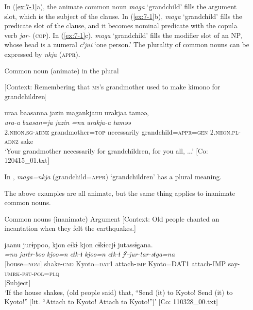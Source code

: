 \z
\z

In (\ref{ex:7-1}a), the animate common noun \textit{maga} ‘grandchild’ fills the argument slot, which is the subject of the clause. In (\ref{ex:7-1}b), \textit{maga} ‘grandchild’ fills the predicate slot of the clause, and it becomes nominal predicate with the copula verb \textit{jar-} (\textsc{cop}). In (\ref{ex:7-1}c), \textit{maga} ‘grandchild’ fills the modifier slot of an NP, whose head is a numeral \textit{cˀjui} ‘one person.’ The plurality of common nouns can be expressed by \textit{nkja} (\textsc{appr}).

\ea \label{ex:7:2}  Common noun (animate) in the plural

  [Context: Remembering that \textsc{ms}’s grandmother used to make kimono for grandchildren]

{\TM}
\glll uraa  baasanna  jazin  magankjanu urakjaa  taməə,\\
\textit{ura-a}  \textit{baasan=ja}  \textit{jazin}  \textit{=nu}   \textit{urakja-a}  \textit{taməə}\\
    2.\textsc{nhon}.\textsc{sg}-\textsc{adnz}  grandmother=\textsc{top}  necessarily  grandchild=\textsc{appr}=\textsc{gen}  2.\textsc{nhon}.\textsc{pl}-\textsc{adnz}  sake\\
\glt    ‘Your grandmother necessarily for grandchildren, for you all, ...’ [Co: 120415\_01.txt]

\z

In , \textit{maga=nkja} (grandchild=\textsc{appr}) ‘grandchildren’ has a plural meaning.

  The above examples are all animate, but the same thing applies to inanimate common nouns.

\ea \label{ex:7:3}  Common nouns (inanimate)
\ea \label{ex:7:3a}Argument
    [Context: Old people chanted an incantation when they felt the earthquakes.]

{\TM}
\gllll  jaanu  jurɨppoo,  kjon  cɨkɨ  kjon   cɨkɨccjɨ  jutassɨgana.\\
\textit{=nu}  \textit{jurɨr-boo}  \textit{kjoo=n}  \textit{cɨk-ɨ}  \textit{kjoo=n}   \textit{cɨk-ɨ}  \textit{jˀ-jur-tar-sɨga=na}\\
{}[house=\textsc{nom}]  shake-\textsc{cnd}  Kyoto=\textsc{dat}1  attach-\textsc{imp}  Kyoto=DAT1  attach-IMP  say-\textsc{umrk}-\textsc{pst}-\textsc{pol}=\textsc{plq}\\
{}[Subject]        \\
\glt ‘If the house shakes, (old people said) that, “Send (it) to Kyoto! Send (it) to Kyoto!” [lit. “Attach to Kyoto! Attach to Kyoto!”]’ [Co: 110328\_00.txt]


